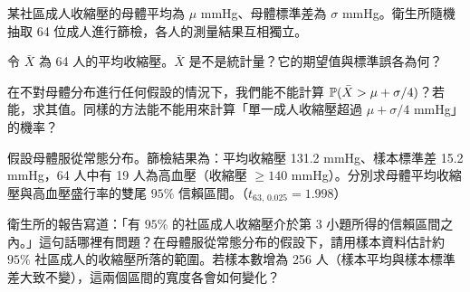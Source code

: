 
\renewcommand{\chapterlabel}{第 5--6 章\ 抽樣分布、中央極限定理與區間估計}
\newcommand{\handoutkind}{課堂練習}

\newcommand{\workspace}{\par\vspace{\stretch{1}}}



\begin{scenario}
    某社區成人收縮壓的母體平均為 $\mu$ mmHg、母體標準差為 $\sigma$ mmHg。衛生所隨機抽取 64 位成人進行篩檢，各人的測量結果互相獨立。
\end{scenario}
\begin{subproblems}
     令 $\bar{X}$ 為 64 人的平均收縮壓。$\bar{X}$ 是不是統計量？它的期望值與標準誤各為何？ \workspace

     在不對母體分布進行任何假設的情況下，我們能不能計算 $\mathbb{P}(\bar{X} > \mu + \sigma/4)$？若能，求其值。同樣的方法能不能用來計算「單一成人收縮壓超過 $\mu + \sigma/4$ mmHg」的機率？ \workspace

     假設母體服從常態分布。篩檢結果為：平均收縮壓 131.2 mmHg、樣本標準差 15.2 mmHg，64 人中有 19 人為高血壓（收縮壓 $\ge 140$ mmHg）。分別求母體平均收縮壓與高血壓盛行率的雙尾 $95\%$ 信賴區間。（$t_{63,\,0.025} = 1.998$） \workspace

     衛生所的報告寫道：「有 $95\%$ 的社區成人收縮壓介於第 3 小題所得的信賴區間之內。」這句話哪裡有問題？在母體服從常態分布的假設下，請用樣本資料估計約 $95\%$ 社區成人的收縮壓所落的範圍。若樣本數增為 256 人（樣本平均與樣本標準差大致不變），這兩個區間的寬度各會如何變化？ \workspace
\end{subproblems}
\newpage

